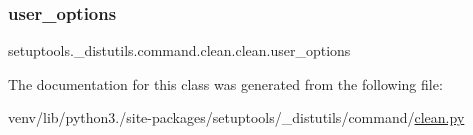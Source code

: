 \subsubsection{\texorpdfstring{user\+\_\+options}{user\_options}}
{\footnotesize\ttfamily setuptools.\+\_\+distutils.\+command.\+clean.\+clean.\+user\+\_\+options\hspace{0.3cm}{\ttfamily [static]}}



The documentation for this class was generated from the following file\+:\begin{DoxyCompactItemize}
\item 
venv/lib/python3./site-\/packages/setuptools/\+\_\+distutils/command/\hyperlink{clean_8py}{clean.\+py}\end{DoxyCompactItemize}
